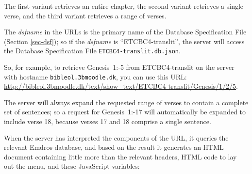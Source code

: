 \documentclass[11pt,oneside,a4paper]{memoir}
\newcommand*{\bibleref}[3]{#1~#2\thinspace:\thinspace#3}
\begin{document}
The first variant retrieves an entire chapter, the second variant retrieves a single verse, and the
third variant retrieves a range of verses.

The \emph{dsfname} in the URLs is the primary name of the Database Specification File%
(Section \ref{sec-dsf}); so if the \emph{dsfname} is ``ETCBC4-translit'', the
server will access the Database Specification File \texttt{ETCBC4-translit.db.json}.

So, for example, to retrieve \bibleref{Genesis}{1}{2-5} from ETCBC4-translit on the
server with hostname \texttt{bibleol.3bmoodle.dk}, you can use this URL:
\url{http://bibleol.3bmoodle.dk/text/show_text/ETCBC4-translit/Genesis/1/2/5}.

The server will always expand the requested range of verses to contain a complete set of sentences;
so a request for \bibleref{Genesis}{1}{16-17} will automatically be expanded to include verse 18,
because verses 17 and 18 comprise a single sentence.

When the server has interpreted the components of the URL, it queries the relevant Emdros database,
and based on the result it generates an HTML document containing little more than the relevant
headers, HTML code to lay out the menu, and these JavaScript variables:
\end{document}

